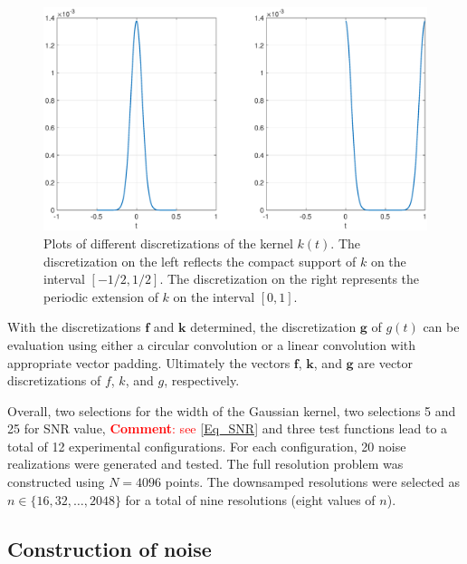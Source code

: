 \documentclass[12pt]{article}
\newcommand{\gcon}{g}
\newcommand{\kcon}{k}
\newcommand{\fcon}{f}
\newcommand{\gdis}{\mathbf{g}}
\newcommand{\kdis}{\mathbf{k}}
\newcommand{\fdis}{\mathbf{f}}
\newcommand{\comment}[1]{\textcolor{red}{ \textbf{Comment}: #1}}
\begin{document}
\begin{figure}
	\centerline{\includegraphics[scale = 0.45]{Figures/RegAndTroughGaussian.eps}}
\caption{Plots of different discretizations of the kernel $\kcon(t)$. The discretization on the left reflects the compact support of $\kcon$ on the interval $[-1/2,1/2]$. The discretization on the right represents the periodic extension of $\kcon$ on the interval $[0,1]$.}
\label{RegAndTroughGaussian}
\end{figure}

With the discretizations $\fdis$ and $\kdis$ determined, the discretization $\gdis$ of $\gcon(t)$ can be evaluation using either a circular convolution or a linear convolution with appropriate vector padding. Ultimately the vectors $\fdis$, $\kdis$, and $\gdis$ are vector discretizations of $\fcon$, $\kcon$, and $\gcon$, respectively. \par
Overall, two selections for the width of the Gaussian kernel, two selections 5 and 25 for SNR value, \comment{see \eqref{Eq_SNR}} and three test functions lead to a total of 12 experimental configurations. For each configuration, 20 noise realizations were generated and tested. The full resolution problem was constructed using $N = 4096$ points. The downsamped resolutions were selected as $n \in \{16,32,\ldots,2048\}$ for a total of nine resolutions (eight values of $n$).

\subsection{Construction of noise} \label{Construction of noise}
\end{document}
